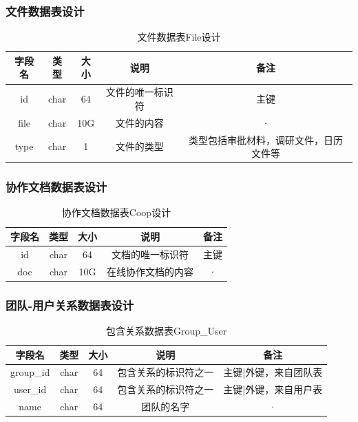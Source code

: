 \subsubsection{文件数据表设计}
\begin{table}[htbp]
\centering
\caption{文件数据表File设计} \label{tab:order-database}
\begin{tabular}{|c|c|c|c|c|}
    \hline
    字段名 & 类型 & 大小 & 说明 & 备注 \\
    \hline
    id & char & 64 & 文件的唯一标识符 & 主键\\
    \hline
    file & char & 10G & 文件的内容 & · \\
    \hline
    type & char & 1 & 文件的类型 & 类型包括审批材料，调研文件，日历文件等 \\
    \hline
\end{tabular}
\end{table}
\newpage
\subsubsection{协作文档数据表设计}
\begin{table}[htbp]
\centering
\caption{协作文档数据表Coop设计} \label{tab:order-database}
\begin{tabular}{|c|c|c|c|c|}
    \hline
    字段名 & 类型 & 大小 & 说明 & 备注 \\
    \hline
    id & char & 64 & 文档的唯一标识符 & 主键\\
    \hline
    doc & char & 10G & 在线协作文档的内容 & · \\
    \hline
\end{tabular}
\end{table}
\subsubsection{团队-用户关系数据表设计}
\begin{table}[htbp]
\centering
\caption{包含关系数据表Group\_User} \label{tab:order-database}
\begin{tabular}{|c|c|c|c|c|}
    \hline
    字段名 & 类型 & 大小 & 说明 & 备注 \\
    \hline
    group\_id & char & 64 & 包含关系的标识符之一 & 主键|外键，来自团队表
    \\
    \hline
    user\_id & char & 64 & 包含关系的标识符之一 & 主键|外键，来自用户表 \\
    \hline
    name & char & 64 & 团队的名字 & · \\
    \hline
\end{tabular}
\end{table}
